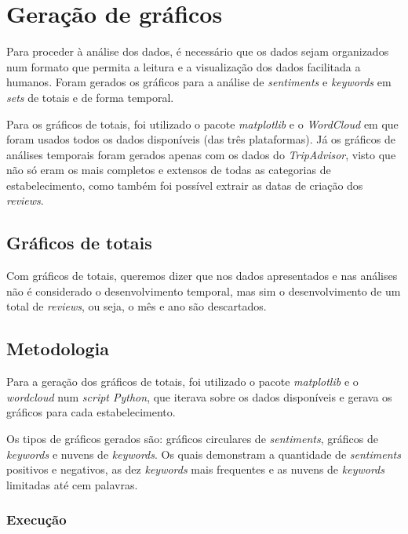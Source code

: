 \chapter{Geração de gráficos}
\label{cap7}

Para proceder à análise dos dados, é necessário que os dados sejam organizados num formato que permita a leitura e a visualização dos dados facilitada a humanos. Foram gerados os gráficos para a análise de \textit{sentiments} e \textit{keywords} em \textit{sets} de totais e de forma temporal.

Para os gráficos de totais, foi utilizado o pacote \textit{matplotlib} \cite{va1} e o \textit{WordCloud} \cite{gfg3} em que foram usados todos os dados disponíveis (das três plataformas). Já os gráficos de análises temporais foram gerados apenas com os dados do \textit{TripAdvisor}, visto que não só eram os mais completos e extensos de todas as categorias de estabelecimento, como também foi possível extrair as datas de criação dos \textit{reviews}.

\section{Gráficos de totais}

Com gráficos de totais, queremos dizer que nos dados apresentados e nas análises não é considerado o desenvolvimento temporal, mas sim o desenvolvimento de um total de \textit{reviews}, ou seja, o mês e ano são descartados.

\section{Metodologia}

Para a geração dos gráficos de totais, foi utilizado o pacote \textit{matplotlib} \cite{va1} e o \textit{wordcloud} \cite{gfg3} num \textit{script Python}, que iterava sobre os dados disponíveis e gerava os gráficos para cada estabelecimento.

Os tipos de gráficos gerados são: gráficos circulares de \textit{sentiments}, gráficos de \textit{keywords} e nuvens de \textit{keywords}. Os quais demonstram a quantidade de \textit{sentiments} positivos e negativos, as dez \textit{keywords} mais frequentes e as nuvens de \textit{keywords} limitadas até cem palavras.

\subsection{Execução}

